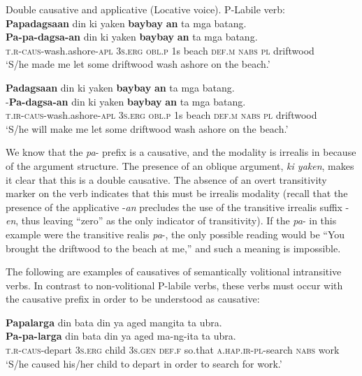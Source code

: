 \ea
Double causative and applicative (Locative voice). P-Labile verb: \\
\textbf{Papadagsaan}  din  ki  yaken  \textbf{baybay}  \textbf{an}  ta  mga batang. \\\smallskip
\gll \textbf{Pa-pa-dagsa-an}  din  ki  yaken  \textbf{baybay}  \textbf{an}  ta  mga batang. \\
\textsc{t.r}-\textsc{caus}-wash.ashore-\textsc{apl}  3\textsc{s.erg}  \textsc{obl.p}  1s  beach  \textsc{def.m}  \textsc{nabs} \textsc{pl} driftwood \\
\glt `S/he made me let some driftwood wash ashore on the beach.’
\z

\ea
\label{bkm:Ref501176811}
\textbf{Padagsaan}  din  ki  yaken  \textbf{baybay}  \textbf{an}  ta  mga batang. \\\smallskip
\gll \emptyset{}-\textbf{Pa-dagsa-an}  din  ki  yaken  \textbf{baybay}  \textbf{an}  ta  mga batang. \\
\textsc{t.ir-caus}-wash.ashore-\textsc{apl}  3\textsc{s.erg}  \textsc{obl.p}  1s  beach  \textsc{def.m}  \textsc{nabs}  \textsc{pl} driftwood \\
\glt `S/he will make me let some driftwood wash ashore on the beach.’
\z

We know that the \textit{pa}{}- prefix is a causative, and the modality is irrealis in  because of the argument structure. The presence of an oblique argument, \textit{ki yaken}, makes it clear that this is a double causative. The absence of an overt transitivity marker on the verb indicates that this must be irrealis modality (recall that the presence of the applicative -\textit{an} precludes the use of the transitive irrealis suffix -\textit{en}, thus leaving “zero” as the only indicator of transitivity). If the \textit{pa}{}- in this example were the transitive realis \textit{pa}{}-, the only possible reading would be “You brought the driftwood to the beach at me,” and such a meaning is impossible.

The following are examples of causatives of semantically volitional intransitive verbs. In contrast to non-volitional P-labile verbs, these verbs must occur with the causative prefix in order to be understood as causative:

\ea
\textbf{Papalarga}  din  bata  din  ya  aged  mangita ta  ubra.\\\smallskip
\gll \textbf{Pa-pa-larga}  din  bata  din  ya  aged  ma-ng-ita ta  ubra.\\
\textsc{t.r}-\textsc{caus}-depart  3\textsc{s.erg}  child  3\textsc{s.gen}  \textsc{def.f}  so.that \textsc{a.hap.ir}-\textsc{pl}-search \textsc{nabs}  work \\
\glt ‘S/he caused his/her child to depart in order to search for work.’
\z

